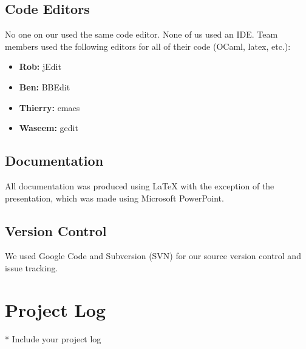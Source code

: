 \subsection{Code Editors}

No one on our used the same code editor.  None of us used an IDE.  Team members used the following editors for all of their code (OCaml, latex, etc.):

\begin{itemize}
\item \textbf{Rob:} jEdit
\item \textbf{Ben:} BBEdit
\item \textbf{Thierry:} emacs
\item \textbf{Waseem:} gedit
\end{itemize}

\subsection{Documentation}
All documentation was produced using LaTeX with the exception of the presentation, which was made using Microsoft PowerPoint.

\subsection{Version Control}
We used Google Code and Subversion (SVN) for our source version control and issue tracking.

\section{Project Log}
* Include your project log

